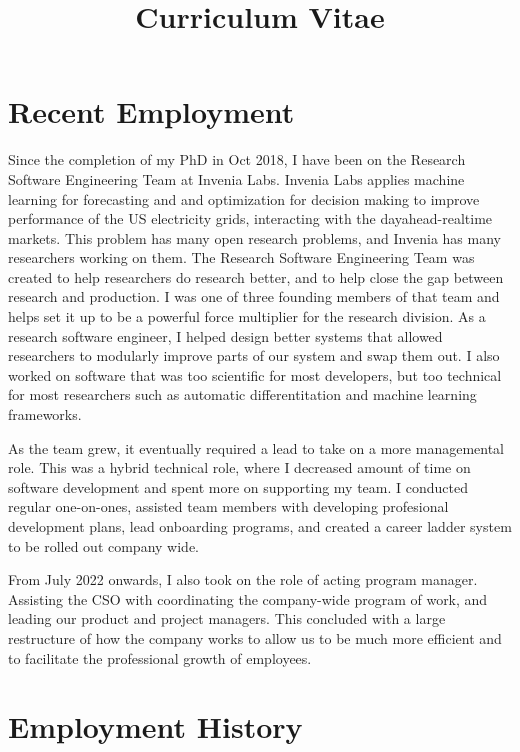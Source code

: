 \documentclass[11pt,a4paper,sans]{moderncv}
\title{Curriculum Vitae}
\begin{document}
\makecvtitle

\section{Recent Employment}
Since the completion of my PhD in Oct 2018, I have been on the Research Software Engineering Team at Invenia Labs.
Invenia Labs applies machine learning for forecasting and and optimization for decision making to improve performance of the US electricity grids, interacting with the dayahead-realtime markets.
This problem has many open research problems, and Invenia has many researchers working on them.
The Research Software Engineering Team was  created to help researchers do research better, and to help close the gap between research and production.
I was one of three founding members of that team and helps set it up to be a powerful force multiplier for the research division.
As a research software engineer, I helped design better systems that allowed researchers to modularly improve parts of our system and swap them out.
I also worked on software that was too scientific for most developers, but too technical for most researchers such as automatic differentitation and machine learning frameworks.

As the team grew, it eventually required a lead to take on a more managemental role.
This was a hybrid technical role, where I decreased amount of time on software development and spent more on supporting my team.
I conducted regular one-on-ones, assisted team members with developing profesional development plans, lead onboarding programs, and created a career ladder system to be rolled out company wide.

From July 2022 onwards, I also took on the role of acting program manager.
Assisting the CSO with coordinating the company-wide program of work, and leading our product and project managers.
This concluded with a large restructure of how the company works to allow us to be much more efficient and to facilitate the professional growth of employees.

\section{Employment History}
\end{document}
